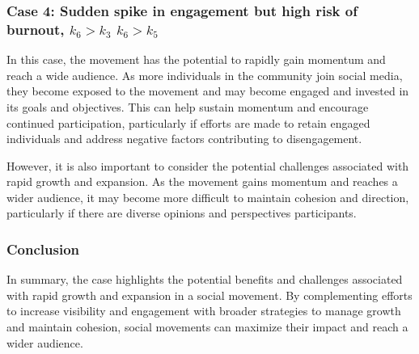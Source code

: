 \documentclass{article}
\begin{document}
    \subsubsection*{Case 4: Sudden spike in engagement but high risk of burnout, $k_6 > k_3$  $k_6 > k_5$}
    \begin{tcolorbox}
   In this case, the movement has the potential to rapidly gain momentum and reach a wide audience. As more individuals in the community join social media, they become exposed to the movement and may become engaged and invested in its goals and objectives. This can help sustain momentum and encourage continued participation, particularly if efforts are made to retain engaged individuals and address negative factors contributing to disengagement. 
   
   However, it is also important to consider the potential challenges associated with rapid growth and expansion. As the movement gains momentum and reaches a wider audience, it may become more difficult to maintain cohesion and direction, particularly if there are diverse opinions and perspectives  participants.
    \subsubsection*{Conclusion} In summary,  the case highlights the potential benefits and challenges associated with rapid growth and expansion in a social movement. By complementing efforts to increase visibility and engagement with broader strategies to manage growth and maintain cohesion, social movements can maximize their impact and reach a wider audience.
    \end{tcolorbox}
\end{document}
